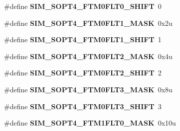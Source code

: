 \begin{DoxyCompactItemize}
\item 
\hypertarget{group___s_i_m___register___masks_gafc9e6a78afb92b0ff8189d6bc30c39ce}{}\#define {\bfseries S\+I\+M\+\_\+\+S\+O\+P\+T4\+\_\+\+F\+T\+M0\+F\+L\+T0\+\_\+\+S\+H\+I\+F\+T}~0\label{group___s_i_m___register___masks_gafc9e6a78afb92b0ff8189d6bc30c39ce}

\item 
\hypertarget{group___s_i_m___register___masks_gaa42586e5889050292d5e70bf2d1aea2d}{}\#define {\bfseries S\+I\+M\+\_\+\+S\+O\+P\+T4\+\_\+\+F\+T\+M0\+F\+L\+T1\+\_\+\+M\+A\+S\+K}~0x2u\label{group___s_i_m___register___masks_gaa42586e5889050292d5e70bf2d1aea2d}

\item 
\hypertarget{group___s_i_m___register___masks_gaf503fb0314431593f41ebe5fa4b83851}{}\#define {\bfseries S\+I\+M\+\_\+\+S\+O\+P\+T4\+\_\+\+F\+T\+M0\+F\+L\+T1\+\_\+\+S\+H\+I\+F\+T}~1\label{group___s_i_m___register___masks_gaf503fb0314431593f41ebe5fa4b83851}

\item 
\hypertarget{group___s_i_m___register___masks_gafa0c4deac7488857fd22e28602b612fb}{}\#define {\bfseries S\+I\+M\+\_\+\+S\+O\+P\+T4\+\_\+\+F\+T\+M0\+F\+L\+T2\+\_\+\+M\+A\+S\+K}~0x4u\label{group___s_i_m___register___masks_gafa0c4deac7488857fd22e28602b612fb}

\item 
\hypertarget{group___s_i_m___register___masks_gacca0c622cfa1e0c7e7214096c38c6557}{}\#define {\bfseries S\+I\+M\+\_\+\+S\+O\+P\+T4\+\_\+\+F\+T\+M0\+F\+L\+T2\+\_\+\+S\+H\+I\+F\+T}~2\label{group___s_i_m___register___masks_gacca0c622cfa1e0c7e7214096c38c6557}

\item 
\hypertarget{group___s_i_m___register___masks_gaf3ef04467d5458abf63abbcd570167b9}{}\#define {\bfseries S\+I\+M\+\_\+\+S\+O\+P\+T4\+\_\+\+F\+T\+M0\+F\+L\+T3\+\_\+\+M\+A\+S\+K}~0x8u\label{group___s_i_m___register___masks_gaf3ef04467d5458abf63abbcd570167b9}

\item 
\hypertarget{group___s_i_m___register___masks_gafaf31902b7c45d1b035c950592fd5672}{}\#define {\bfseries S\+I\+M\+\_\+\+S\+O\+P\+T4\+\_\+\+F\+T\+M0\+F\+L\+T3\+\_\+\+S\+H\+I\+F\+T}~3\label{group___s_i_m___register___masks_gafaf31902b7c45d1b035c950592fd5672}

\item 
\hypertarget{group___s_i_m___register___masks_ga605f729e3f4faddc18e957c077adf61a}{}\#define {\bfseries S\+I\+M\+\_\+\+S\+O\+P\+T4\+\_\+\+F\+T\+M1\+F\+L\+T0\+\_\+\+M\+A\+S\+K}~0x10u\label{group___s_i_m___register___masks_ga605f729e3f4faddc18e957c077adf61a}


\end{DoxyCompactItemize}
